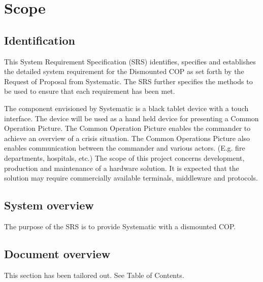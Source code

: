 \documentclass[Main]{subfiles}
\begin{document}
\chapter{Scope}

\section{Identification}
This System Requirement Specification (SRS) identifies, specifies and establishes the detailed system requirement for the Dismounted COP as set forth by the Request of Proposal from Systematic.
The SRS further specifies the methods to be used to ensure that each requirement has been met. 

The component envisioned by Systematic is a black tablet device with a touch interface. The device will be
used as a hand held device for presenting a Common Operation Picture. The Common Operation Picture
enables the commander to achieve an overview of a crisis situation. The Common Operations Picture also
enables communication between the commander and various actors. (E.g. fire departments, hospitals, etc.)
The scope of this project concerns development, production and maintenance of a hardware solution. 
It is expected that the solution may require commercially available terminals, middleware and protocols.

\section{System overview}
The purpose of the SRS is to provide Systematic with a dismounted COP. 


\section{Document overview}
This section has been tailored out. See Table of Contents.
\end{document}
